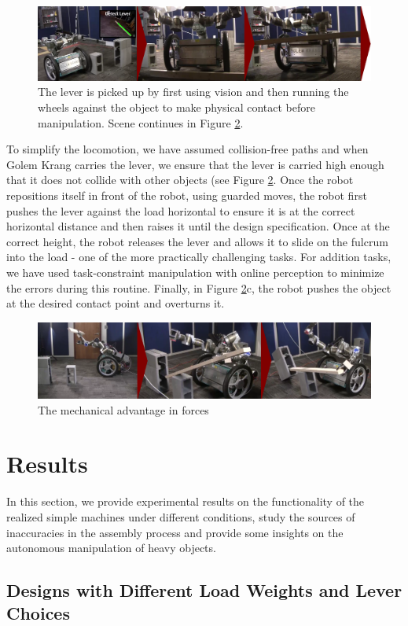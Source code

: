 \documentclass[runningheads,a4paper]{llncs}
\begin{document}
\begin{figure}[ht!]  	
  \centering
  \includegraphics[width=1.0\linewidth]{Figures/c.png}
  \caption{The lever is picked up by first using vision and then running
	the wheels against the object to make physical contact before manipulation. Scene continues 
	in Figure \ref{fig:typical_d}.}
  \label{fig:typical_c}
\end{figure}

To simplify the locomotion, we have assumed collision-free paths and when Golem Krang carries the
lever, we ensure that the lever is carried high enough that it does not collide with other objects
(see Figure \ref{fig:typical_d}. Once the robot repositions itself in front of the robot, using
guarded moves, the robot first pushes the lever against the load horizontal to ensure it is at
the correct horizontal distance and then raises it until the design specification. Once at the
correct height, the robot releases the lever and allows it to slide on the fulcrum into the load
 - one of the more practically challenging tasks. For addition tasks, we have used task-constraint
 manipulation with online perception to minimize the errors during this routine. Finally, in
 Figure \ref{fig:typical_d}c, the robot pushes the object at the desired contact point and overturns
it.

\begin{figure}[ht!] 
  \centering
  \includegraphics[width=1.0\linewidth]{Figures/d.png}
  \caption{The mechanical advantage in forces}
  \label{fig:typical_d}
\end{figure}

\section{Results}

In this section, we provide experimental results on the functionality of the realized simple
machines under different conditions, study the sources of inaccuracies in the assembly process
and provide some insights on the autonomous manipulation of heavy objects. 

\subsection{Designs with Different Load Weights and Lever Choices}


\newpage


\end{document}
